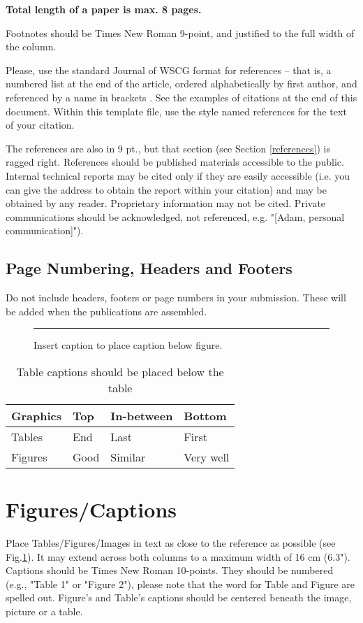 \documentclass[twoside,twocolumn,10pt]{article}
\begin{document}
{\bfseries Total length of a paper is max. 8 pages.}

Footnotes should be Times New Roman 9-point, and justified to the full width of the column.

Please, use the standard Journal of WSCG format for references -- that is, a numbered list at the end of the article, ordered alphabetically by first author, and referenced by a name in brackets \cite{con00a}. See the examples of citations at the end of this document. Within this template file, use the style named references for the text of your citation.

The references are also in 9 pt., but that section (see Section \ref{references}) is ragged right. References should be published materials accessible to the public. Internal technical reports may be cited only if they are easily accessible (i.e. you can give the address to obtain the report within your citation) and may be obtained by any reader. Proprietary information may not be cited. Private communications should be acknowledged, not referenced, e.g. "[Adam, personal communication]").

\subsection*{Page Numbering, Headers and Footers}
Do not include headers, footers or page numbers in your submission. These will be added when the publications are assembled.

\begin{figure}[htb]
    \centering
    \rule{6cm}{3cm}
    \caption{Insert caption to place caption below figure.}
    \label{fig:box}
\end{figure}

\begin{table}[htb]
	\centering
	\begin{tabular}{|l|l|l|l|}
	\hline
	Graphics & Top & In-between & Bottom \\
	\hline
	Tables & End & Last & First \\
	\hline
	Figures & Good & Similar & Very well \\
	\hline
	\end{tabular}
	\caption{Table captions should be placed below the table}
\end{table}

\section{Figures/Captions}
Place Tables/Figures/Images in text as close to the reference as possible (see Fig.\ref{fig:box}). It may extend across both columns to a maximum width of 16 cm (6.3"). Captions should be Times New Roman 10-points.  They should be numbered (e.g., "Table 1" or "Figure 2"), please note that the word for Table and Figure are spelled out. Figure's and Table's captions should be centered beneath the image, picture or a table.
\end{document}
